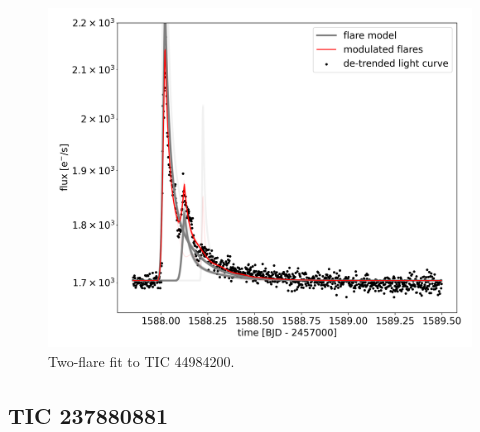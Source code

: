 \documentclass[fleqn,usenatbib,letters]{mnras}%
\newcommand{\FB}{TIC 44984200} %
\newcommand{\FC}{TIC 237880881} %
\begin{document}
\begin{figure}
	\includegraphics[width=\columnwidth]{figures/04_08_2020_13_40_TIC44984200_flarefit_50retrievals.png}
    \caption{Two-flare fit to \FB.}
    \label{fig:fit2\FB}
\end{figure}

\subsection{\FC}
\end{document}
